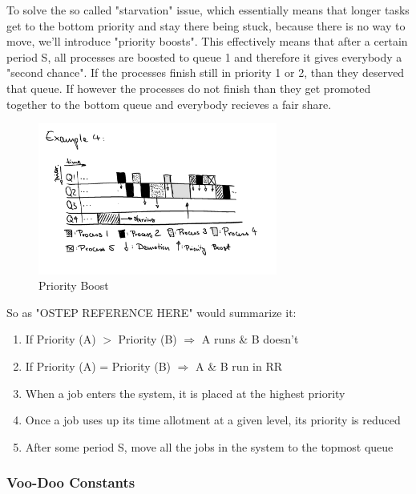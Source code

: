\documentclass{report}
\begin{document}
To solve the so called "starvation" issue, which essentially means that longer tasks get to the bottom priority and stay there being stuck, because there is no way to move, we'll introduce "priority boosts".
This effectively means that after a certain period S, all processes are boosted to queue 1 and therefore it gives everybody a "second chance". If the processes finish still in priority 1 or 2, than they deserved that queue.
If however the processes do not finish than they get promoted together to the bottom queue and everybody recieves a fair share.

\begin{figure}[h]
  \begin{center}
    \includegraphics[width=0.7\textwidth]{assets/mlfq-diag-4.png}
    \caption{Priority Boost}
    \label{mlfq-diag-4}
  \end{center}
\end{figure}

\noindent So as "OSTEP REFERENCE HERE" would summarize it:
\begin{enumerate}
  \item If Priority (A) $>$ Priority (B) $\Rightarrow$ A runs \& B doesn't
  \item If Priority (A) = Priority (B) $\Rightarrow$ A \& B run in RR
  \item When a job enters the system, it is placed at the highest priority
  \item Once a job uses up its time allotment at a given level, its priority is reduced
  \item After some period S, move all the jobs in the system to the topmost queue
\end{enumerate}

\subsubsection{Voo-Doo Constants}
\end{document}
